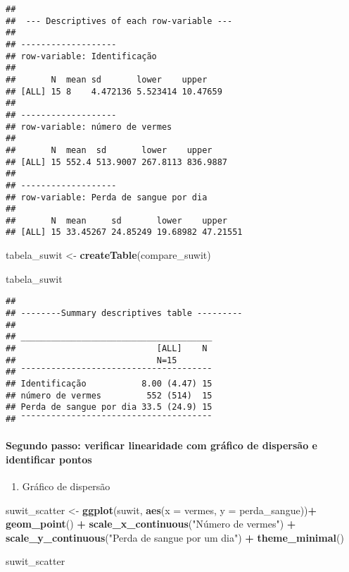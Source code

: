 \documentclass[]{article}
\newenvironment{Shaded}{\begin{snugshade}}{\end{snugshade}}
\newcommand{\DataTypeTok}[1]{\textcolor[rgb]{0.13,0.29,0.53}{#1}}
\newcommand{\KeywordTok}[1]{\textcolor[rgb]{0.13,0.29,0.53}{\textbf{#1}}}
\newcommand{\NormalTok}[1]{#1}
\newcommand{\OperatorTok}[1]{\textcolor[rgb]{0.81,0.36,0.00}{\textbf{#1}}}
\newcommand{\StringTok}[1]{\textcolor[rgb]{0.31,0.60,0.02}{#1}}
\providecommand{\tightlist}{%
  \setlength{\itemsep}{0pt}\setlength{\parskip}{0pt}}
\let\oldparagraph\paragraph
\renewcommand{\paragraph}[1]{\oldparagraph{#1}\mbox{}}
\begin{document}
\begin{verbatim}
## 
##  --- Descriptives of each row-variable ---
## 
## ------------------- 
## row-variable: Identificação 
## 
##       N  mean sd       lower    upper   
## [ALL] 15 8    4.472136 5.523414 10.47659
## 
## ------------------- 
## row-variable: número de vermes 
## 
##       N  mean  sd       lower    upper   
## [ALL] 15 552.4 513.9007 267.8113 836.9887
## 
## ------------------- 
## row-variable: Perda de sangue por dia 
## 
##       N  mean     sd       lower    upper   
## [ALL] 15 33.45267 24.85249 19.68982 47.21551
\end{verbatim}

\begin{Shaded}
\begin{Highlighting}[]
\NormalTok{tabela_suwit <-}\StringTok{ }\KeywordTok{createTable}\NormalTok{(compare_suwit)}

\NormalTok{tabela_suwit}
\end{Highlighting}
\end{Shaded}

\begin{verbatim}
## 
## --------Summary descriptives table ---------
## 
## ______________________________________ 
##                            [ALL]    N  
##                            N=15        
## ¯¯¯¯¯¯¯¯¯¯¯¯¯¯¯¯¯¯¯¯¯¯¯¯¯¯¯¯¯¯¯¯¯¯¯¯¯¯ 
## Identificação           8.00 (4.47) 15 
## número de vermes         552 (514)  15 
## Perda de sangue por dia 33.5 (24.9) 15 
## ¯¯¯¯¯¯¯¯¯¯¯¯¯¯¯¯¯¯¯¯¯¯¯¯¯¯¯¯¯¯¯¯¯¯¯¯¯¯
\end{verbatim}

\hypertarget{segundo-passo-verificar-linearidade-com-grafico-de-dispersao-e-identificar-pontos}{%
\paragraph{Segundo passo: verificar linearidade com gráfico de dispersão
e identificar
pontos}\label{segundo-passo-verificar-linearidade-com-grafico-de-dispersao-e-identificar-pontos}}

\begin{enumerate}
\def\labelenumi{\arabic{enumi})}
\tightlist
\item
  Gráfico de dispersão
\end{enumerate}

\begin{Shaded}
\begin{Highlighting}[]
\NormalTok{suwit_scatter <-}\StringTok{ }\KeywordTok{ggplot}\NormalTok{(suwit, }\KeywordTok{aes}\NormalTok{(}\DataTypeTok{x =}\NormalTok{ vermes, }\DataTypeTok{y =}\NormalTok{ perda_sangue))}\OperatorTok{+}
\StringTok{  }\KeywordTok{geom_point}\NormalTok{() }\OperatorTok{+}
\StringTok{  }\KeywordTok{scale_x_continuous}\NormalTok{(}\StringTok{"Número de vermes"}\NormalTok{) }\OperatorTok{+}
\StringTok{  }\KeywordTok{scale_y_continuous}\NormalTok{(}\StringTok{"Perda de sangue por um dia"}\NormalTok{) }\OperatorTok{+}
\StringTok{  }\KeywordTok{theme_minimal}\NormalTok{()}

\NormalTok{suwit_scatter}
\end{Highlighting}
\end{Shaded}
\end{document}
